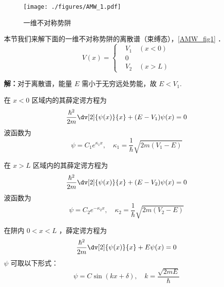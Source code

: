 \begin{figure}[ht]
\centering
\texttt{[image: ./figures/AMW\_1.pdf]}
\caption{一维不对称势阱} \label{AMW_fig1}
\end{figure}
本节我们来解下面的一维不对称势阱的离散谱（束缚态），\autoref{AMW_fig1} ．
\begin{equation}
V(x)=\left\{\begin{aligned}
&V_1\quad(x<0)\\
&0\\
&V_2\quad(x>L)
\end{aligned}\right.
\end{equation}

\textbf{解：}对于离散谱，能量 $E$ 需小于无穷远处势能，故 $E<V_1$. 

在 $x<0$ 区域内的其薛定谔方程为
\begin{equation}
\frac{\hbar^2}{2m}\dv[2]{\psi(x)}{x}+(E-V_1)\psi(x)=0
\end{equation}
波函数为
\begin{equation}
\psi=C_1 e^{\kappa_1 x},\quad \kappa_1=\frac{1}{\hbar}\sqrt{2m(V_1-E)}
\end{equation}

在 $x>L$ 区域内的其薛定谔方程为
\begin{equation}
\frac{\hbar^2}{2m}\dv[2]{\psi(x)}{x}+(E-V_2)\psi(x)=0
\end{equation}
波函数为
\begin{equation}
\psi=C_2 e^{-\kappa_2 x},\quad \kappa_2=\frac{1}{\hbar}\sqrt{2m(V_2-E)}
\end{equation}

在阱内 $0 < x < L$ ，薛定谔方程为
\begin{equation}
\frac{\hbar^2}{2m}\dv[2]{\psi(x)}{x}+E\psi(x)=0
\end{equation}
$\psi$ 可取以下形式：
\begin{equation}
\psi=C\sin(kx+\delta),\quad k=\frac{\sqrt{2mE}}{\hbar}
\end{equation}
